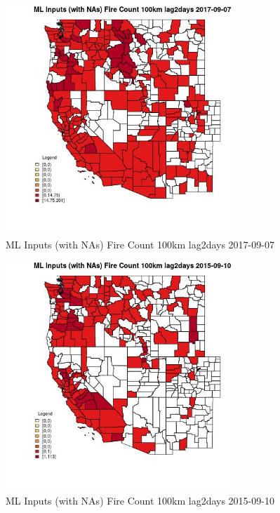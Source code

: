 \clearpage 

\begin{figure} 
\centering  
\includegraphics[width=0.77\textwidth]{Code_Outputs/Report_ML_input_PM25_Step4_part_e_de_duplicated_aves_compiled_2019-05-20wNAs_CountyFire_Count_100km_lag2daysMean2017-09-07.jpg} 
\caption{\label{fig:Report_ML_input_PM25_Step4_part_e_de_duplicated_aves_compiled_2019-05-20wNAsCountyFire_Count_100km_lag2daysMean2017-09-07}ML Inputs (with NAs) Fire Count 100km lag2days 2017-09-07} 
\end{figure} 
 

\begin{figure} 
\centering  
\includegraphics[width=0.77\textwidth]{Code_Outputs/Report_ML_input_PM25_Step4_part_e_de_duplicated_aves_compiled_2019-05-20wNAs_CountyFire_Count_100km_lag2daysMean2015-09-10.jpg} 
\caption{\label{fig:Report_ML_input_PM25_Step4_part_e_de_duplicated_aves_compiled_2019-05-20wNAsCountyFire_Count_100km_lag2daysMean2015-09-10}ML Inputs (with NAs) Fire Count 100km lag2days 2015-09-10} 
\end{figure} 
 

